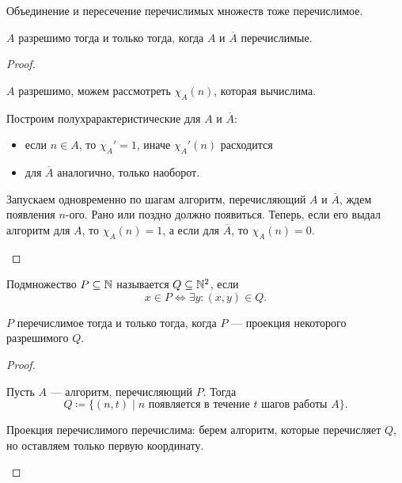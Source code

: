 
\begin{thm}
    Объединение и пересечение перечислимых множеств тоже перечислимое.
\end{thm}

\begin{thm}[Пост]
    $ A$ разрешимо тогда и только тогда, когда $ A$ и $ \overline{A}$ перечислимые.
\end{thm}
\begin{proof}
    $ $
    \begin{description}
        \item {} 
			$ A $ разрешимо, можем рассмотреть $ \chi_{A}(n)$, которая вычислима.

			Построим полухрарактеристические для $ A$ и $ \overline{A}$:
			\begin{itemize}
			\item если $ n \in A$, то $ \chi_{A}' = 1$, иначе $ \chi_{A}'(n)$ расходится
			\item для $ \overline{A}$ аналогично, только наоборот.
			\end{itemize}
        \item {} 
			Запускаем одновременно по шагам алгоритм, перечисляющий $ A$ и $ \overline{A}$, ждем появления $ n$-ого. Рано или поздно должно появиться. Теперь, если его выдал алгоритм для $ A$, то $ \chi_A(n) = 1$, а если для $\overline{A}$, то $ \chi_A(n) = 0$.
    \end{description} 
\end{proof}


\begin{defn}[Проекция]
	Подмножество $ P \subseteq \mathbb{N}$ называется  $ Q \subseteq \mathbb{N}^2$, если   \[
		x \in  P \Longleftrightarrow \exists y \colon  (x, y) \in  Q
	.\] 
\end{defn}
\begin{thm}[О проекции]
    $ P$ перечислимое тогда и только тогда, когда $ P$ --- проекция некоторого разрешимого $ Q$.
\end{thm}
\begin{proof}
    $ $
    \begin{description}
        \item {} 
			Пусть $ A$ --- алгоритм, перечисляющий $ P$. Тогда 
			\[
				Q \coloneqq \{(n, t) \mid n \text{ появляется в течение } t \text{ шагов работы } A\}
			.\] 
        \item {} 
			Проекция перечислимого перечислима: берем алгоритм, которые перечисляет $ Q$, но оставляем только первую координату.
    \end{description} 
\end{proof}

